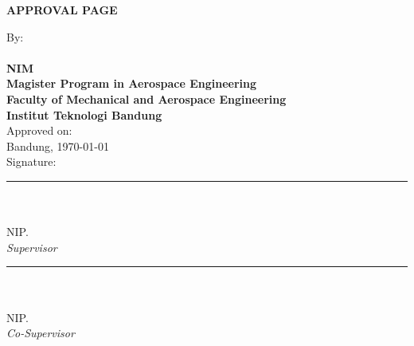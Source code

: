 \clearpage
\begin{center}
\begin{doublespace}
\textbf{\Large \MakeUppercase{APPROVAL PAGE}}
\end{doublespace}
\end{center}

\begin{center}
\begin{doublespace}
\textbf{\Large\MakeUppercase {\judul}}
\end{doublespace}
\end{center}

\begin{center}
By:\\
\textbf{\penulis}\\
\textbf{NIM \nim}\\[0.4cm]

\textbf{Magister Program in Aerospace Engineering\\
Faculty of Mechanical and Aerospace Engineering \\
Institut Teknologi Bandung}\\

Approved on: \\[1cm]

\noindent Bandung, \today\\[2em]
Signature:\\[3cm]

\noindent
\begin{minipage}[t]{0.45\textwidth}
    \centering
    \rule{\linewidth}{0.5pt}\\
    \textbf{\pembimbingsatu}\\
    NIP. \NIPpbbsatu\\
    \vspace{0.5em}
    \textit{Supervisor}
\end{minipage}
\hfill
\begin{minipage}[t]{0.45\textwidth}
    \centering
    \rule{\linewidth}{0.5pt}\\
    \textbf{\pembimbingdua}\\
    NIP. \NIPpbbdua\\
    \vspace{0.5em}
    \textit{Co-Supervisor}
\end{minipage}
\end{center}
\vfill